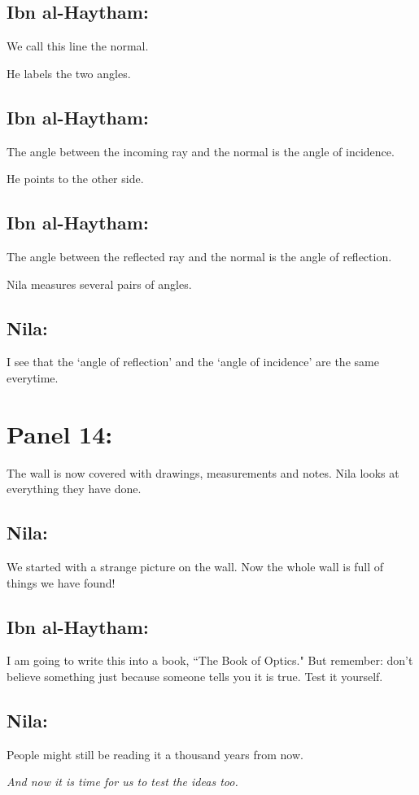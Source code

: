\documentclass{xtufte-handout}
\begin{document}
\subsection{Ibn al-Haytham:} We call this line the normal.

He labels the two angles.

\subsection{Ibn al-Haytham:} The angle between the incoming ray and the normal is the angle of incidence.

He points to the other side.
\subsection{Ibn al-Haytham:} The angle between the reflected ray and the normal is the angle of reflection.

Nila measures several pairs of angles.
\subsection{Nila:} I see that the `angle of reflection' and the `angle of incidence' are the same everytime.

\section{Panel 14:}
The wall is now covered with drawings, measurements and notes. Nila looks at everything they have done.
\subsection{Nila:} We started with a strange picture on the wall. Now the whole wall is full of things we have found!

\subsection{Ibn al-Haytham:} I am going to write this into a book, ``The Book of Optics." But remember: don't believe something just because someone tells you it is true. Test it yourself.
\subsection{Nila:} People might still be reading it a thousand years from now.

\emph{And now it is time for us to test the ideas too.}
\end{document}
